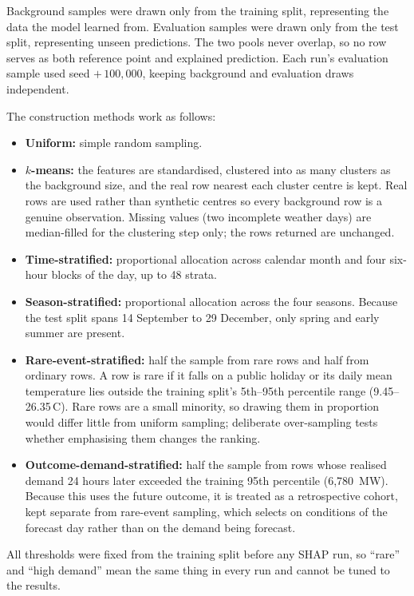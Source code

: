\documentclass[11pt,a4paper]{article}
\begin{document}
Background samples were drawn only from the training split, representing the data the model learned from. Evaluation samples were drawn only from the test split, representing unseen predictions. The two pools never overlap, so no row serves as both reference point and explained prediction. Each run's evaluation sample used seed $+\,100{,}000$, keeping background and evaluation draws independent.

The construction methods work as follows:
\begin{itemize}
  \item \textbf{Uniform:} simple random sampling.
  \item \textbf{$k$-means:} the features are standardised, clustered into as many clusters as the background size, and the real row nearest each cluster centre is kept. Real rows are used rather than synthetic centres so every background row is a genuine observation. Missing values (two incomplete weather days) are median-filled for the clustering step only; the rows returned are unchanged.
  \item \textbf{Time-stratified:} proportional allocation across calendar month and four six-hour blocks of the day, up to 48 strata.
  \item \textbf{Season-stratified:} proportional allocation across the four seasons. Because the test split spans 14 September to 29 December, only spring and early summer are present.
  \item \textbf{Rare-event-stratified:} half the sample from rare rows and half from ordinary rows. A row is rare if it falls on a public holiday or its daily mean temperature lies outside the training split's 5th--95th percentile range (9.45--26.35\,\textdegree C). Rare rows are a small minority, so drawing them in proportion would differ little from uniform sampling; deliberate over-sampling tests whether emphasising them changes the ranking.
  \item \textbf{Outcome-demand-stratified:} half the sample from rows whose realised demand 24 hours later exceeded the training 95th percentile (6{,}780~MW). Because this uses the future outcome, it is treated as a retrospective cohort, kept separate from rare-event sampling, which selects on conditions of the forecast day rather than on the demand being forecast.
\end{itemize}

All thresholds were fixed from the training split before any SHAP run, so ``rare'' and ``high demand'' mean the same thing in every run and cannot be tuned to the results.
\end{document}
